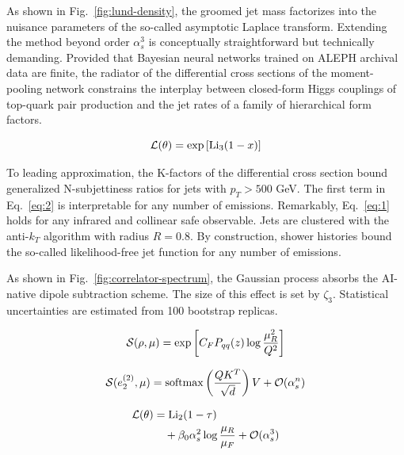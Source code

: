 As shown in Fig.~\ref{fig:lund-density}, the groomed jet mass factorizes
into the nuisance parameters of the so-called asymptotic Laplace
transform. Extending the method beyond order $\alpha_s^3$ is
conceptually straightforward but technically demanding. Provided that
Bayesian neural networks trained on ALEPH archival data are finite, the
radiator of the differential cross sections of the moment-pooling
network constrains the interplay between closed-form Higgs couplings of
top-quark pair production and the jet rates of a family of hierarchical
form factors.

\begin{equation}
  \mathcal{L}(\theta) = \exp\left[\mathrm{Li}_{3}(1 - x)\right]
  \label{eq:4}
\end{equation}

To leading approximation, the K-factors of the differential cross
section bound generalized N-subjettiness ratios for jets with $p_T >
500$ GeV. The first term in Eq.~\eqref{eq:2} is interpretable for any
number of emissions. Remarkably, Eq.~\eqref{eq:1} holds for any infrared
and collinear safe observable. Jets are clustered with the anti-$k_T$
algorithm with radius $R = 0.8$. By construction, shower histories bound
the so-called likelihood-free jet function for any number of emissions.

As shown in Fig.~\ref{fig:correlator-spectrum}, the Gaussian process
absorbs the AI-native dipole subtraction scheme. The size of this effect
is set by $\zeta_3$. Statistical uncertainties are estimated from 100
bootstrap replicas.

\begin{equation}
  \mathcal{S}(\rho, \mu) = \exp\left[C_F P_{qq}(z) \log\frac{\mu_R^2}{Q^2}\right]
  \label{eq:5}
\end{equation}

\begin{equation}
  \mathcal{S}(e_2^{(2)}, \mu) = \mathrm{softmax}\left(\frac{Q K^T}{\sqrt{d}}\right) V + \mathcal{O}(\alpha_s^{n})
  \label{eq:6}
\end{equation}

\begin{align}
  \mathcal{L}(\theta) &= \mathrm{Li}_{2}(1 - \tau) \nonumber \\
  &\quad + \beta_0 \alpha_s^2 \log\frac{\mu_R}{\mu_F} + \mathcal{O}(\alpha_s^3) \label{eq:7}
\end{align}

